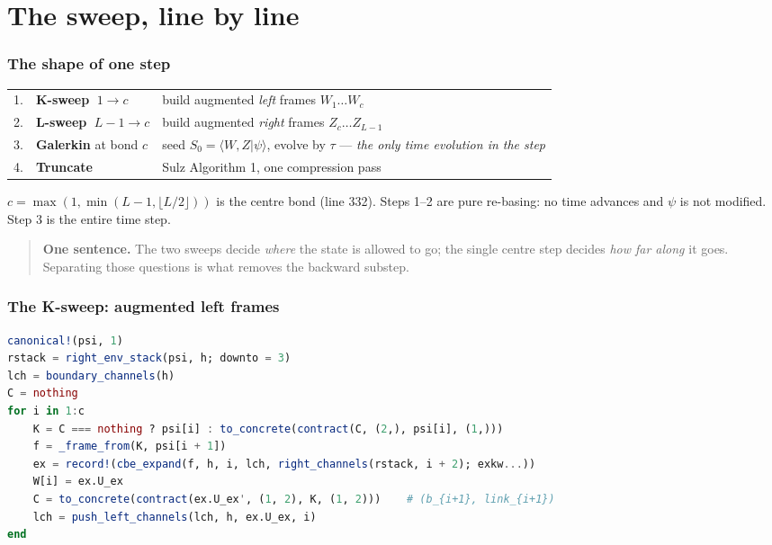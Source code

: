 \documentclass[11pt,a4paper]{article}
\begin{document}
\part{The sweep, line by line}
\label{part:sweep}

\section{The shape of one step}

\begin{center}
\begin{tabular}{@{}rlp{8.6cm}@{}}
\toprule
1. & \textbf{K-sweep} $\;1 \to c$   & build augmented \emph{left} frames $W_1 \dots W_c$ \\
2. & \textbf{L-sweep} $\;L-1 \to c$ & build augmented \emph{right} frames $Z_c \dots Z_{L-1}$ \\
3. & \textbf{Galerkin} at bond $c$  & seed $S_0=\langle W,Z|\psi\rangle$, evolve by $\tau$ ---
                                      \emph{the only time evolution in the step} \\
4. & \textbf{Truncate}              & Sulz Algorithm 1, one compression pass \\
\bottomrule
\end{tabular}
\end{center}

\noindent
$c = \max(1,\min(L-1,\lfloor L/2\rfloor))$ is the centre bond (line 332). Steps 1--2 are pure
re-basing: no time advances and $\psi$ is not modified. Step 3 is the entire time step.

\begin{quote}
\color{note}
\textbf{One sentence.} The two sweeps decide \emph{where} the state is allowed to go; the single
centre step decides \emph{how far along} it goes. Separating those questions is what removes the
backward substep.
\end{quote}

\section{The K-sweep: augmented left frames}
\label{sec:ksweep}

\begin{lstlisting}[language=Julia,firstnumber=383]
canonical!(psi, 1)
rstack = right_env_stack(psi, h; downto = 3)
lch = boundary_channels(h)
C = nothing
for i in 1:c
    K = C === nothing ? psi[i] : to_concrete(contract(C, (2,), psi[i], (1,)))
    f = _frame_from(K, psi[i + 1])
    ex = record!(cbe_expand(f, h, i, lch, right_channels(rstack, i + 2); exkw...))
    W[i] = ex.U_ex
    C = to_concrete(contract(ex.U_ex', (1, 2), K, (1, 2)))    # (b_{i+1}, link_{i+1})
    lch = push_left_channels(lch, h, ex.U_ex, i)
end
\end{lstlisting}
\end{document}
